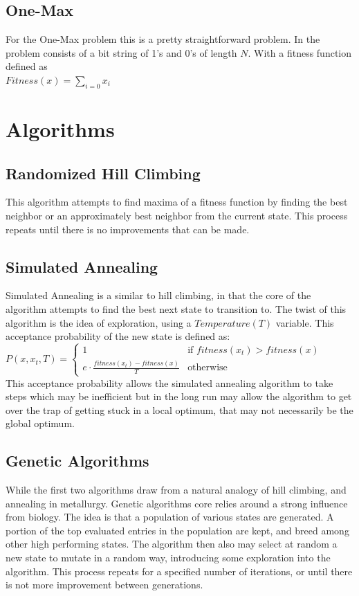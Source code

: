 \documentclass[
letterpaper, %
]{IEEEtran}
\begin{document}
	\subsection{One-Max}
	For the One-Max problem this is a pretty straightforward problem. In the problem consists of a bit string of 1's and 0's of length $N$. With a fitness function defined as \\ $Fitness(x) = \sum_{i=0}x_i$ 
	
	\section{Algorithms}
	\subsection{Randomized Hill Climbing}
	This algorithm attempts to find maxima of a fitness function by finding the best neighbor or an approximately best neighbor from the current state. This process repeats until there is no improvements that can be made.
	
	\subsection{Simulated Annealing}
	Simulated Annealing is a similar to hill climbing, in that the core of the algorithm attempts to find the best next state to transition to. The twist of this algorithm is the idea of exploration, using a $Temperature (T)$ variable. This acceptance probability of the new state is defined as: \\
	\begin{math}
		P(x,x_t,T) = \begin{cases}
			1 &  \text{if $fitness(x_t) > fitness(x)$} \\
			e \cdot \frac{fitness(x_t) - fitness(x)}{T} & \text{otherwise}
		\end{cases}
	\end{math} \\
	This acceptance probability allows the simulated annealing algorithm to take steps which may be inefficient but in the long run may allow the algorithm to get over the trap of getting stuck in a local optimum, that may not necessarily be the global optimum.
	
	\subsection{Genetic Algorithms}
	While the first two algorithms draw from a natural analogy of hill climbing, and annealing in metallurgy. Genetic algorithms core relies around a strong influence from biology. The idea is that a population of various states are generated. A portion of the top evaluated entries in the population are kept, and breed among other high performing states. The algorithm then also may select at random a new state to mutate in a random way, introducing some exploration into the algorithm. This process repeats for a specified number of iterations, or until there is not more improvement between generations.
	
\end{document}
